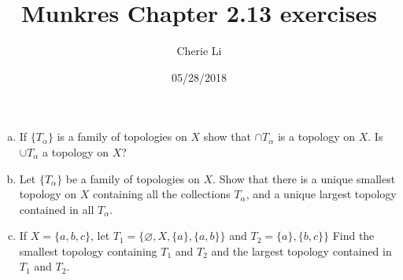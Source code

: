 \documentclass[12pt]{article}
\title{Munkres Chapter 2.13 exercises}
\author{Cherie Li}
\date{05/28/2018}
\newenvironment{problem}[2][Problem]
{
	\begin{trivlist} 
		\item[\hskip \labelsep {\bfseries #1 #2:}]
	}
{
	\end{trivlist}
	}
\begin{document}
\maketitle
\newpage
%
%
%
%
\begin{problem}[Exercise]{2.13.4}
	\hfill	
	\begin{enumerate}[(a)]
		\item If $\lbrace{T_\alpha \rbrace}$ is a family of topologies on $X$ show that $\cap T_\alpha$ is a topology on $X$. Is $\cup T_\alpha$ a topology on $X$? 
		\item Let $\lbrace{T_\alpha\rbrace}$ be a family of topologies on $X$. Show that there is a unique smallest topology on $X$ containing all the collections $T_\alpha$, and a unique largest topology contained in all $T_\alpha$.  
		\item If $X = \lbrace{a, b, c\rbrace}$, let $T_1 = \lbrace{\varnothing, X, \lbrace{a\rbrace},  \lbrace{a,b\rbrace}\rbrace}$ and $T_2 = \lbrace{{a\rbrace},  \lbrace{b,c\rbrace}\rbrace}$ Find the smallest topology containing $T_1$ and $T_2$ and the largest topology contained in $T_1$ and $T_2$. 
	\end{enumerate}
\end{problem}
\end{document}
